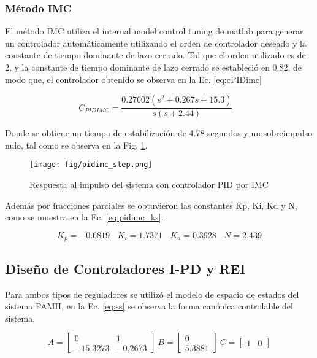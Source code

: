 \documentclass[conference,onecolumn,12pt]{IEEEtran}
\numberwithin{equation}{subsection}
\begin{document}
\subsubsection{Método IMC}

El método IMC utiliza el internal model control tuning de matlab para generar un controlador automáticamente utilizando el orden de controlador deseado y la constante de tiempo dominante de lazo cerrado. Tal que el orden utilizado es de 2, y la constante de tiempo dominante de lazo cerrado se estableció en 0.82, de modo que, el controlador obtenido se observa en la Ec. \ref{eq:cPIDimc}

\begin{equation}
    C_{PIDIMC} = \frac{0.27602(s^2+0.267s+15.3)}{s(s+2.44)} \ \ \ \ 
    \label{eq:cPIDimc}
\end{equation}

Donde se obtiene un tiempo de estabilización de 4.78 segundos y un sobreimpulso nulo, tal como se observa en la Fig. \ref{fig:pidimcstep}.

\begin{figure}[!ht]
    \centering
    \texttt{[image: fig/pidimc\_step.png]}
    \caption{Respuesta al impulso del sistema con controlador PID por IMC}
    \label{fig:pidimcstep}
\end{figure}

Además por fracciones parciales se obtuvieron las constantes Kp, Ki, Kd y N, como se muestra en la Ec. \ref{eq:pidimc_ks}.

\begin{equation}
    K_p = -0.6819\ \ \ \ K_i = 1.7371 \ \ \ \ K_d = 0.3928\ \ \ \ N = 2.439
    \label{eq:pidimc_ks}
\end{equation}

\subsection{Diseño de Controladores I-PD y REI}

Para ambos tipos de reguladores se utilizó el modelo de espacio de estados del sistema PAMH, en la Ec. \ref{eq:ss} se observa la forma canónica controlable del sistema.

\begin{equation}
    A = \begin{bmatrix}
0 & 1 \\
 -15.3273 &  -0.2673
\end{bmatrix} \ B=\begin{bmatrix}
 0 \\
 5.3881
\end{bmatrix} \ C = \begin{bmatrix}
1 & 0
\end{bmatrix}
\label{eq:ss}
\end{equation}
\end{document}

